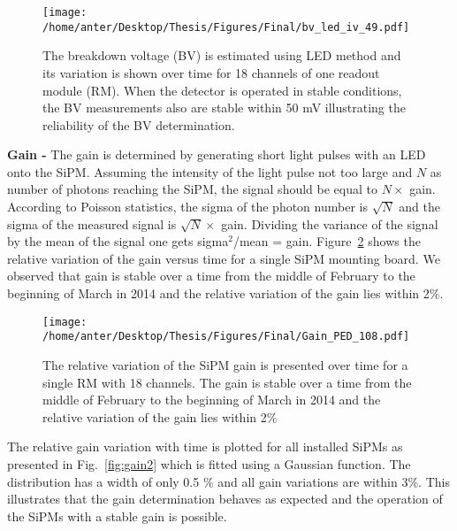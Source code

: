 \begin{figure}[!h]
\begin{center}
\vspace*{-10mm}
\hspace*{-5mm}
\texttt{[image: /home/anter/Desktop/Thesis/Figures/Final/bv\_led\_iv\_49.pdf]}\\
\vspace*{4mm}
\caption[The breakdown voltage (BV) is estimated using LED method and its variation is shown over time for 18 channels of one readout module (RM).]{The breakdown voltage (BV) is estimated using LED method and its variation is shown over time for 18 channels of one readout module (RM). When the detector is operated in stable conditions, the BV measurements also are stable within 50 mV illustrating the reliability of the BV determination.}
\label{fig:BV}
\end{center}
\end{figure} \newline
{\bf Gain -} The gain is determined by generating short light pulses with an LED onto the SiPM. Assuming the intensity of the light pulse not too large and $N$ as number of photons reaching the SiPM, the signal should be equal to $N \times$ gain. According to Poisson statistics, the sigma of the photon number is $\sqrt{N}$ and the sigma of the measured signal is $\sqrt{N} \times$ gain. Dividing the variance of the signal by the mean of the signal one gets sigma$^2$/mean = gain. Figure~\ref{fig:gain1} shows the relative variation of the gain versus time for a single SiPM mounting board. We observed that gain is stable over a time from the middle of February to the beginning of March in 2014 and the relative variation of the gain lies within 2\%. 
\begin{figure}[!h]
\begin{center}
\vspace{-2mm}
\texttt{[image: /home/anter/Desktop/Thesis/Figures/Final/Gain\_PED\_108.pdf]}
\vspace*{4mm}
\caption{The relative variation of the SiPM gain is presented over time for a single RM with 18 channels. The gain is stable over a time from the middle of February to the beginning of March in 2014 and the relative variation of the gain lies within 2\%}
\label{fig:gain1}
\end{center}
\end{figure}\newline
The relative gain variation with time is plotted for all installed SiPMs as presented in Fig.~\ref{fig:gain2} which is fitted using a Gaussian function. The distribution has a width of only 0.5 \% and all gain variations are within 3\%. This illustrates that the gain determination behaves as expected and the operation of the SiPMs with a stable gain is possible. 
